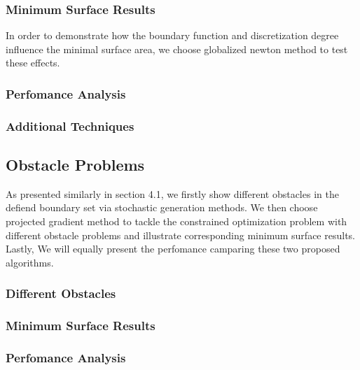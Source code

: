 \subsubsection{Minimum Surface Results}
In order to demonstrate how the boundary function and discretization degree influence the minimal surface area, we choose globalized newton method to test these effects.
\subsubsection{Perfomance Analysis}
\subsubsection{Additional Techniques}
\subsection{Obstacle Problems}
As presented similarly in section 4.1, we firstly show different obstacles in the defiend boundary set via stochastic generation methods. We then choose projected gradient method to tackle the constrained optimization problem with different obstacle problems and illustrate corresponding minimum surface results. Lastly, We will equally present the perfomance camparing these two proposed algorithms. 
\subsubsection{Different Obstacles}
\subsubsection{Minimum Surface Results}
\subsubsection{Perfomance Analysis}



